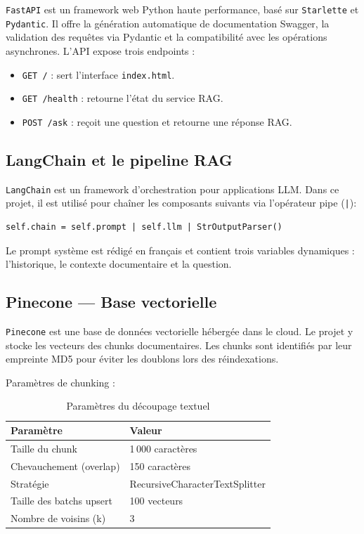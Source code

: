 \documentclass[12pt, a4paper, twoside]{report}
\newcommand{\tech}[1]{\texttt{\color{accent}#1}}
\newcommand{\file}[1]{\texttt{\footnotesize #1}}
\begin{document}
\tech{FastAPI} est un framework web Python haute performance, basé sur \tech{Starlette} et \tech{Pydantic}. Il offre la génération automatique de documentation Swagger, la validation des requêtes via Pydantic et la compatibilité avec les opérations asynchrones. L'API expose trois endpoints :

\begin{itemize}
  \item \texttt{GET /} : sert l'interface \file{index.html}.
  \item \texttt{GET /health} : retourne l'état du service RAG.
  \item \texttt{POST /ask} : reçoit une question et retourne une réponse RAG.
\end{itemize}

\subsection{LangChain et le pipeline RAG}

\tech{LangChain} est un framework d'orchestration pour applications LLM. Dans ce projet, il est utilisé pour chaîner les composants suivants via l'opérateur pipe (\texttt{|}):

\begin{lstlisting}[language=python3, caption={Chaîne RAG définie dans \texttt{rag.py}}]
self.chain = self.prompt | self.llm | StrOutputParser()
\end{lstlisting}

Le prompt système est rédigé en français et contient trois variables dynamiques : l'historique, le contexte documentaire et la question.

\subsection{Pinecone — Base vectorielle}

\tech{Pinecone} est une base de données vectorielle hébergée dans le cloud. Le projet y stocke les vecteurs des chunks documentaires. Les chunks sont identifiés par leur empreinte MD5 pour éviter les doublons lors des réindexations.

Paramètres de chunking :

\begin{table}[H]
\centering
\caption{Paramètres du découpage textuel}
\label{tab:chunking}
\begin{tabular}{ll}
\toprule
\textbf{Paramètre} & \textbf{Valeur} \\
\midrule
Taille du chunk     & 1\,000 caractères \\
Chevauchement (overlap) & 150 caractères \\
Stratégie & RecursiveCharacterTextSplitter \\
Taille des batchs upsert & 100 vecteurs \\
Nombre de voisins (k) & 3 \\
\bottomrule
\end{tabular}
\end{table}
\end{document}
